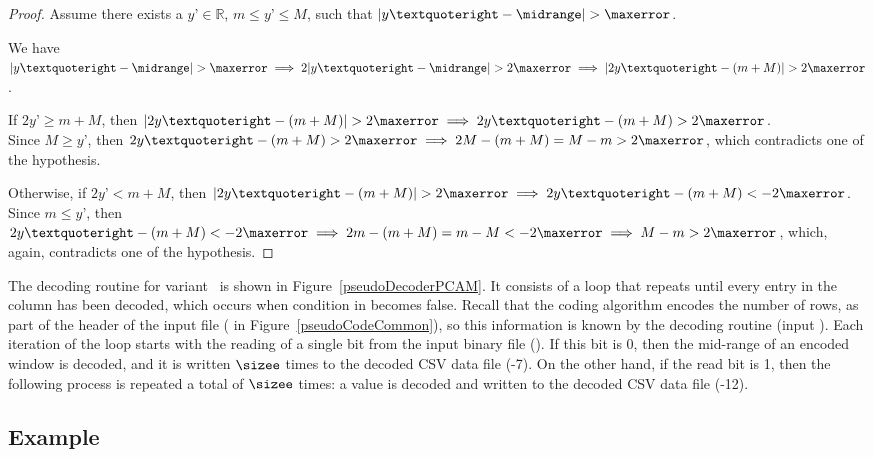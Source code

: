\newcommand{\yOne}{y’}
\begin{proof}
Assume there exists a $\yOne \in \mathbb{R}$, $m\leq \yOne\leq M$, such that $|\yOne-\midrange|> \maxerror$.

We have $|\yOne-\midrange|> \maxerror \implies 2|\yOne-\midrange|> 2\maxerror \implies |2\yOne-(m+M)|> 2\maxerror$.

If $2\yOne\geq m+M$, then $|2\yOne-(m+M)|> 2\maxerror \implies 2\yOne-(m+M)> 2\maxerror$.\\
Since $M\geq \yOne$, then $2\yOne-(m+M)> 2\maxerror \implies 2M-(m+M) = M-m > 2\maxerror$, which contradicts one of the hypothesis.

Otherwise, if $2\yOne< m+M$, then $|2\yOne-(m+M)|> 2\maxerror \implies 2\yOne-(m+M)< -2\maxerror$.\\
Since $m \leq \yOne$, then $2\yOne-(m+M)< -2\maxerror \implies 2m-(m+M)=m-M < -2\maxerror \implies M-m > 2\maxerror$, which, again, contradicts one of the hypothesis.
\end{proof}


The decoding routine for variant \maskalgo\ is shown in Figure~\ref{pseudoDecoderPCAM}. It consists of a loop that repeats until every entry in the column has been decoded, which occurs when condition in  becomes false. Recall that the coding algorithm encodes the number of rows, as part of the header of the input file ( in Figure~\ref{pseudoCodeCommon}), so this information is known by the decoding routine (input \colSize). Each iteration of the loop starts with the reading of a single bit from the input binary file (). If this bit is 0, then the mid-range of an encoded window is decoded, and it is written $\sizee$ times to the decoded CSV data file (-7). On the other hand, if the read bit is 1, then the following process is repeated a total of $\sizee$ times: a value is decoded and written to the decoded CSV data file (-12).





\clearpage




\subsection{Example}
\label{algo:pca:example}
\newcommand{\exampleRecallIrrelevant}[1]{Recall that the specific timestamp values are irrelevant for algorithm #1}


